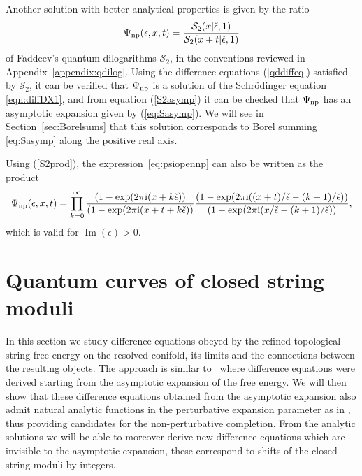 \documentclass[pdftex]{sigma}
\numberwithin{equation}{section}
\begin{document}
Another solution with better analytical properties is given by the ratio
\begin{equation} \label{eq:psiopennp}
 \Psi_{{\rm np}}(\epsilon,x,t)= \frac{\mathcal{S}_2(x|\check{\epsilon},1)}{\mathcal{S}_2(x+t|\check{\epsilon},1)}
\end{equation}
of Faddeev's quantum dilogarithms $\mathcal{S}_2$, in the conventions reviewed in Appendix~\ref{appendix:qdilog}.
Using the difference equations (\ref{qddiffeq}) satisfied by $\mathcal{S}_2$, it can be verified that $\Psi_{{\rm np}}$ is a solution of the Schr\"odinger equation \eqref{eqn:diffDX1}, and from equation (\ref{S2asymp}) it can be checked that $\Psi_{{\rm np}}$ has an asymptotic expansion given by (\ref{eq:Sasymp}). We will see in Section~\ref{sec:Borelsums} that this solution corresponds to Borel summing \eqref{eq:Sasymp} along the positive real axis.

Using (\ref{S2prod}), the expression~\eqref{eq:psiopennp} can also be written as the product
\begin{gather*}
 \Psi_{{\rm np}}(\epsilon,x,t) = \prod_{k=0}^{\infty} \frac{(1-\exp(2\pi \mathrm{i} (x + k \check{\epsilon}))}{(1-\exp(2\pi \mathrm{i} (x+t+k \check{\epsilon}))} \frac{(1-\exp (2\pi \mathrm{i} ((x+t)/\check{\epsilon}-(k+1)/\check{\epsilon}))}{(1-\exp (2\pi \mathrm{i} (x/\check{\epsilon}-(k+1)/\check{\epsilon}))},
\end{gather*}
which is valid for $\operatorname{Im}(\epsilon)>0$.

\section{Quantum curves of closed string moduli}\label{sec:diffeq}

In this section we study difference equations obeyed by the refined topological string free energy on the resolved conifold, its limits and the connections between the resulting objects. The approach is similar to~\cite{alim2020difference, Iwaki2} where difference equations were derived starting from the asymptotic expansion of the free energy. We will then show that these difference equations obtained from the asymptotic expansion also admit natural analytic functions in the perturbative expansion parameter as in \cite{Alim:2021ukq, Alim:2021lld}, thus providing candidates for the non-perturbative completion. From the analytic solutions we will be able to moreover derive new difference equations which are invisible to the asymptotic expansion, these correspond to shifts of the closed string moduli by integers.
\end{document}
